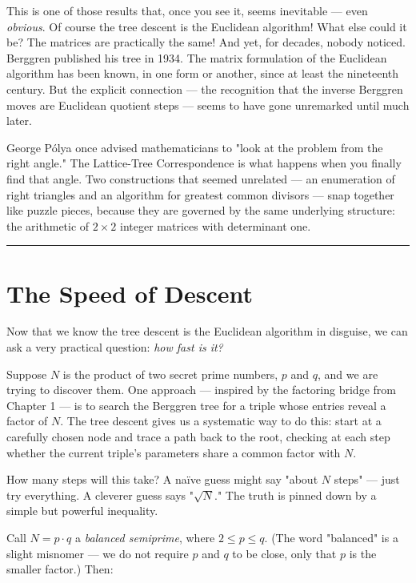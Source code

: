 \documentclass[11pt,openany]{book}
\theoremstyle{definition}
\theoremstyle{plain}
\theoremstyle{remark}
\begin{document}
This is one of those results that, once you see it, seems inevitable — even \textit{obvious}. Of course the tree descent is the Euclidean algorithm! What else could it be? The matrices are practically the same! And yet, for decades, nobody noticed. Berggren published his tree in 1934. The matrix formulation of the Euclidean algorithm has been known, in one form or another, since at least the nineteenth century. But the explicit connection — the recognition that the inverse Berggren moves are Euclidean quotient steps — seems to have gone unremarked until much later.

George Pólya once advised mathematicians to "look at the problem from the right angle." The Lattice-Tree Correspondence is what happens when you finally find that angle. Two constructions that seemed unrelated — an enumeration of right triangles and an algorithm for greatest common divisors — snap together like puzzle pieces, because they are governed by the same underlying structure: the arithmetic of $2 \times 2$ integer matrices with determinant one.

\bigskip\noindent\rule{\textwidth}{0.4pt}\bigskip


\section*{The Speed of Descent}


Now that we know the tree descent is the Euclidean algorithm in disguise, we can ask a very practical question: \textit{how fast is it?}

Suppose $N$ is the product of two secret prime numbers, $p$ and $q$, and we are trying to discover them. One approach — inspired by the factoring bridge from Chapter 1 — is to search the Berggren tree for a triple whose entries reveal a factor of $N$. The tree descent gives us a systematic way to do this: start at a carefully chosen node and trace a path back to the root, checking at each step whether the current triple's parameters share a common factor with $N$.

How many steps will this take? A naïve guess might say "about $N$ steps" — just try everything. A cleverer guess says "$\sqrt{N}$." The truth is pinned down by a simple but powerful inequality.

Call $N = p \cdot q$ a \textit{balanced semiprime}, where $2 \le p \le q$. (The word "balanced" is a slight misnomer — we do not require $p$ and $q$ to be close, only that $p$ is the smaller factor.) Then:
\end{document}

